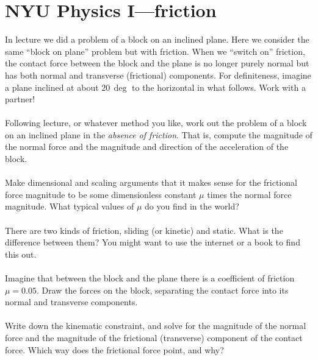 \documentclass[12pt]{article}
\begin{document}
\section*{NYU Physics I---friction}

In lecture we did a problem of a block on an inclined plane.
Here we consider the same ``block on plane'' problem but with
friction.  When we ``switch on'' friction, the contact force between
the block and the plane is no longer purely normal but has both normal
and transverse (frictional) components.  For definiteness, imagine a
plane inclined at about $20\,\deg$ to the horizontal in what
follows. Work with a partner!

\paragraph{\theproblem}%
Following lecture, or whatever method you like, work out the problem
of a block on an inclined plane in the \emph{absence of friction}.
That is, compute the magnitude of the normal force and the magnitude
and direction of the acceleration of the block.

\paragraph{\theproblem}%
Make dimensional and scaling arguments that it makes sense for the
frictional force magnitude to be some dimensionless constant $\mu$
times the normal force magnitude. What typical values of $\mu$ do you
find in the world?

\paragraph{\theproblem}%
There are two kinds of friction, sliding (or kinetic) and static. What
is the difference between them? You might want to use the internet or
a book to find this out.

\paragraph{\theproblem}%
Imagine that between the block and the plane there is a coefficient of
friction $\mu=0.05$.  Draw the forces on the block, separating the
contact force into its normal and transverse components.

\paragraph{\theproblem}%
Write down the kinematic constraint, and solve for the magnitude of
the normal force and the magnitude of the frictional (transverse)
component of the contact force.  Which way does the frictional force
point, and why?
\end{document}
